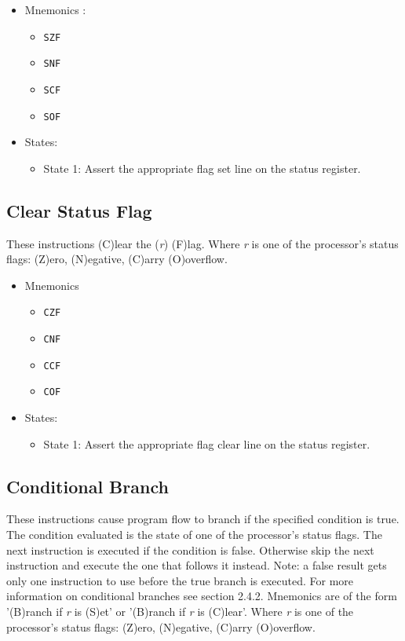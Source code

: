 \documentclass[a4paper,12pt]{article}
\newcommand\rr{\textit{r}}
\begin{document}
\begin{itemize}
\item Mnemonics :
\begin{itemize}
	\item \texttt{SZF}
	\item \texttt{SNF}
	\item \texttt{SCF}
	\item \texttt{SOF}
\end{itemize}
\item States:
\begin{itemize}
	\item State 1: Assert the appropriate flag set line on the status
	register.
\end{itemize}
\end{itemize}

\subsection{Clear Status Flag}
These instructions (C)lear the (\rr{}) (F)lag. Where \rr{} is one of the
processor's status flags: (Z)ero, (N)egative, (C)arry (O)overflow.
\par

\begin{itemize}
\item Mnemonics 
\begin{itemize}
	\item \texttt{CZF}
	\item \texttt{CNF}
	\item \texttt{CCF}
	\item \texttt{COF}
\end{itemize}
\item States:
\begin{itemize}
	\item State 1: Assert the appropriate flag clear line on the status
	register.
\end{itemize}
\end{itemize}

\subsection{Conditional Branch}
These instructions cause program flow to branch if the specified condition is
true. The condition evaluated is the state of one of the processor's status
flags. The next instruction is executed if the condition is false. Otherwise
skip the next instruction and execute the one that follows it instead. Note: a
false result gets only one instruction to use before the true branch is executed.
For more information on conditional branches see section 2.4.2. Mnemonics are of
the form '(B)ranch if \rr{} is (S)et' or '(B)ranch if \rr{} is (C)lear'. Where
\rr{} is one of the processor's status flags: (Z)ero, (N)egative, (C)arry
(O)overflow.
\par
\end{document}

